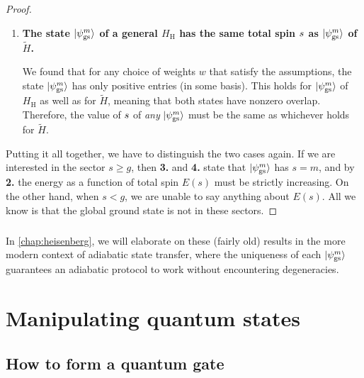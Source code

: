 \begin{proof}
\begin{enumerate}
\item \textbf{The state $\lvert\psi^m_\text{gs}\rangle$ of a general $H_\text{H}$ has the same total spin ${s}$ as $\lvert\psi^m_\text{gs}\rangle$ of $\tilde{H}$.}

We found that for any choice of weights $w$ that satisfy the assumptions, the state $\lvert\psi^m_\text{gs}\rangle$ has only positive entries (in some basis). This holds for $\lvert\psi^m_\text{gs}\rangle$ of $H_\text{H}$ as well as for $\tilde{H}$, meaning that both states have nonzero overlap. Therefore, the value of ${s}$ of \emph{any} $\lvert\psi^m_\text{gs}\rangle$ must be the same as whichever holds for $\tilde{H}$. 
\end{enumerate}
%
Putting it all together, we have to distinguish the two cases again. If we are interested in the sector $s \geq g$, then \textbf{3.} and \textbf{4.} state that $\lvert\psi^m_\text{gs}\rangle$ has $s=m$, and by \textbf{2.} the energy as a function of total spin $E(s)$ must be strictly increasing. On the other hand, when $s<g$, we are unable to say anything about $E(s)$. All we know is that the global ground state is not in these sectors. 
\end{proof}

\paragraph{}  In \cref{chap:heisenberg}, we will elaborate on these (fairly old) results in the more modern context of adiabatic state transfer, where the uniqueness of each $\lvert\psi^m_\text{gs}\rangle$ guarantees an adiabatic protocol to work without encountering degeneracies. 









\chapter{Manipulating quantum states}

%

%


%
%
%
%





\section{How to form a quantum gate}
\label{sec:manipulate}
%

